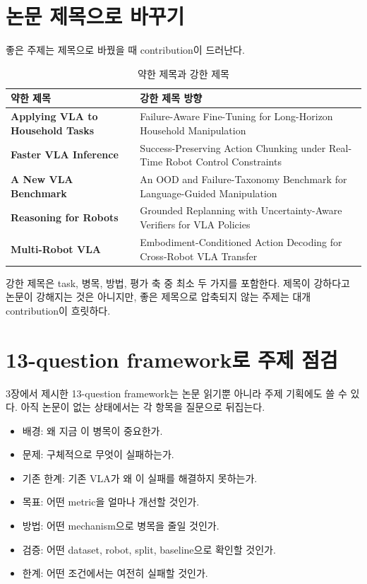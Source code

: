 \section{논문 제목으로 바꾸기}

좋은 주제는 제목으로 바꿨을 때 contribution이 드러난다.

\begin{table}[t]
  \centering
  \caption{약한 제목과 강한 제목}
  \label{tab:vla_title_examples}
  \begin{tabularx}{\textwidth}{>{\bfseries}p{42mm}X}
    \toprule
    약한 제목 & 강한 제목 방향 \\
    \midrule
    Applying VLA to Household Tasks & Failure-Aware Fine-Tuning for Long-Horizon Household Manipulation \\
    Faster VLA Inference & Success-Preserving Action Chunking under Real-Time Robot Control Constraints \\
    A New VLA Benchmark & An OOD and Failure-Taxonomy Benchmark for Language-Guided Manipulation \\
    Reasoning for Robots & Grounded Replanning with Uncertainty-Aware Verifiers for VLA Policies \\
    Multi-Robot VLA & Embodiment-Conditioned Action Decoding for Cross-Robot VLA Transfer \\
    \bottomrule
  \end{tabularx}
\end{table}

강한 제목은 task, 병목, 방법, 평가 축 중 최소 두 가지를 포함한다. 제목이 강하다고 논문이 강해지는 것은 아니지만, 좋은 제목으로 압축되지 않는 주제는 대개 contribution이 흐릿하다.

\section{13-question framework로 주제 점검}

3장에서 제시한 13-question framework는 논문 읽기뿐 아니라 주제 기획에도 쓸 수 있다. 아직 논문이 없는 상태에서는 각 항목을 질문으로 뒤집는다.

\begin{itemize}
  \item 배경: 왜 지금 이 병목이 중요한가.
  \item 문제: 구체적으로 무엇이 실패하는가.
  \item 기존 한계: 기존 VLA가 왜 이 실패를 해결하지 못하는가.
  \item 목표: 어떤 metric을 얼마나 개선할 것인가.
  \item 방법: 어떤 mechanism으로 병목을 줄일 것인가.
  \item 검증: 어떤 dataset, robot, split, baseline으로 확인할 것인가.
  \item 한계: 어떤 조건에서는 여전히 실패할 것인가.
\end{itemize}

